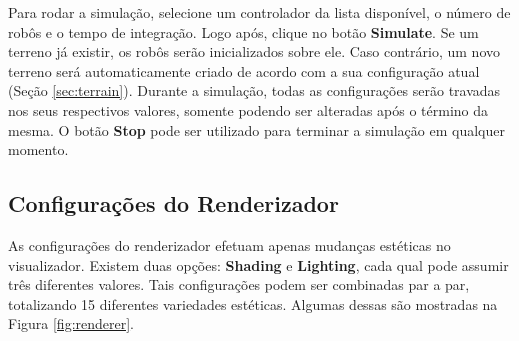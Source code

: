 \documentclass[11pt,a4paper]{article}
\begin{document}
Para rodar a simulação, selecione um controlador da lista disponível,
o número de robôs e o tempo de integração. Logo após, clique no botão
\textbf{Simulate}. Se um terreno já existir, os robôs serão
inicializados sobre ele. Caso contrário, um novo terreno será
automaticamente criado de acordo com a sua configuração atual (Seção
\ref{sec:terrain}). Durante a simulação, todas as configurações serão
travadas nos seus respectivos valores, somente podendo ser alteradas
após o término da mesma. O botão \textbf{Stop} pode ser utilizado para
terminar a simulação em qualquer momento.

\subsection{Configurações do Renderizador}

As configurações do renderizador efetuam apenas mudanças estéticas no
visualizador. Existem duas opções: \textbf{Shading} e
\textbf{Lighting}, cada qual pode assumir três diferentes
valores. Tais configurações podem ser combinadas par a par,
totalizando 15 diferentes variedades estéticas. Algumas dessas são
mostradas na Figura \ref{fig:renderer}.
\end{document}

